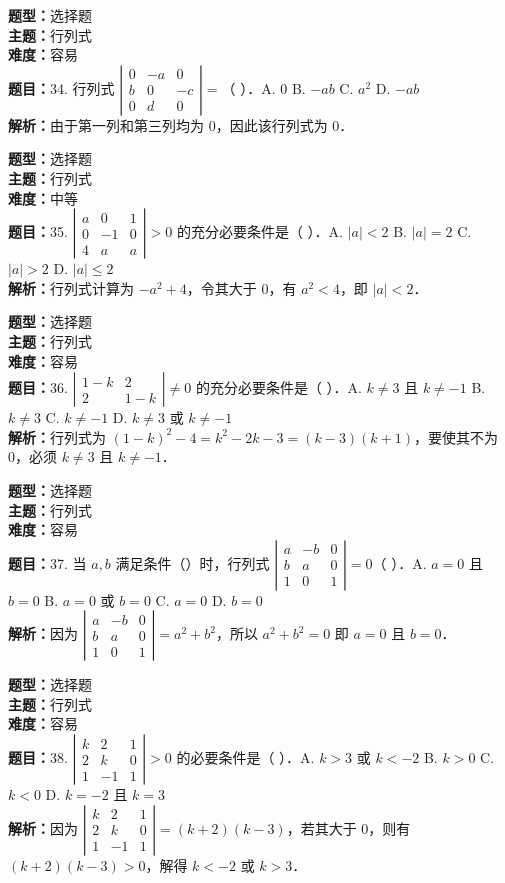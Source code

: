 \documentclass{ctexart}
\newenvironment{question}[5]{%
	\noindent\textbf{题型：}#1\\
	\textbf{主题：}#2\\
	\textbf{难度：}#3\\
	\textbf{题目：}#4\\
	\textbf{解析：}#5\\
	\vspace{1em}
}{}
\begin{document}
\begin{question}
	{选择题}
	{行列式}
	{容易}
	{34. 行列式 $\left|\begin{array}{ccc}0 & -a & 0 \\ b & 0 & -c \\ 0 & d & 0\end{array}\right|=$（ ）．A. 0 B. $-ab$ C. $a^2$ D. $-ab$}
	{由于第一列和第三列均为 0，因此该行列式为 0．}
\end{question}

\begin{question}
	{选择题}
	{行列式}
	{中等}
	{35. $\left|\begin{array}{ccc}a & 0 & 1 \\ 0 & -1 & 0 \\ 4 & a & a\end{array}\right| > 0$ 的充分必要条件是（ ）．A. $|a| < 2$ B. $|a| = 2$ C. $|a| > 2$ D. $|a| \leq 2$}
	{行列式计算为 $-a^2 + 4$，令其大于 0，有 $a^2 < 4$，即 $|a| < 2$．}
\end{question}

\begin{question}
	{选择题}
	{行列式}
	{容易}
	{36. $\left|\begin{array}{cc}1 - k & 2 \\ 2 & 1 - k\end{array}\right| \neq 0$ 的充分必要条件是（ ）．A. $k \neq 3$ 且 $k \neq -1$ B. $k \neq 3$ C. $k \neq -1$ D. $k \neq 3$ 或 $k \neq -1$}
	{行列式为 $(1 - k)^2 - 4 = k^2 - 2k - 3 = (k - 3)(k + 1)$，要使其不为 0，必须 $k \neq 3$ 且 $k \neq -1$．}
\end{question}

\begin{question}
	{选择题}
	{行列式}
	{容易}
	{37. 当 $a, b$ 满足条件（）时，行列式 $\left|\begin{array}{lll}a & -b & 0 \\ b & a & 0 \\ 1 & 0 & 1\end{array}\right|=0$（ ）．A. $a=0$ 且 $b=0$ B. $a=0$ 或 $b=0$ C. $a=0$ D. $b=0$}
	{因为 $\left|\begin{array}{lll}a & -b & 0 \\ b & a & 0 \\ 1 & 0 & 1\end{array}\right|=a^2+b^2$，所以 $a^2+b^2=0$ 即 $a=0$ 且 $b=0$．}
\end{question}

\begin{question}
	{选择题}
	{行列式}
	{容易}
	{38. $\left|\begin{array}{ccc}k & 2 & 1 \\ 2 & k & 0 \\ 1 & -1 & 1\end{array}\right|>0$ 的必要条件是（ ）．A. $k>3$ 或 $k<-2$ B. $k>0$ C. $k<0$ D. $k=-2$ 且 $k=3$}
	{因为 $\left|\begin{array}{ccc}k & 2 & 1 \\ 2 & k & 0 \\ 1 & -1 & 1\end{array}\right|=(k+2)(k-3)$，若其大于 0，则有 $(k+2)(k-3)>0$，解得 $k<-2$ 或 $k>3$．}
\end{question}
\end{document}
